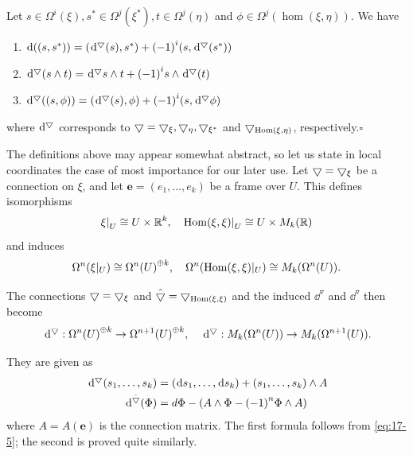 \begin{lemma}\label{lemma:17-12}
Let $s \in  \Omega^{i}(\xi),s^* \in  \Omega^{j}( \xi^*),t \in  \Omega^{j}( \eta )$ and $\phi  \in  \Omega^{j}( {\hom( \xi, \eta) })$. 
We have
\begin{enumerate}
  \item $\dd( ( {s,s^*}) )  = ( {\dd^\btd(s),s^*})  + {(-1) }^{i}( {s,\dd^\btd( s^*) })$
  \item $\dd^\btd( {s \land  t})  = \dd^\btd s \land  t + {(-1) }^{i}s \land  \dd^\btd(t)$
  \item $\dd^\btd( ( {s,\phi }) )  = ( {\dd^\btd(s),\phi })  + {(-1) }^{i}( {s,\dd^\btd\phi })$ 
\end{enumerate}

where $\dd^\btd$ corresponds to $\bigtriangledown  = \bigtriangledown_{\xi },\bigtriangledown_{\eta },\bigtriangledown_{\xi^*}$ 
and $\bigtriangledown_{\operatorname{Hom}( {\xi,\eta}) }$, respectively.\hfill$\square$
\end{lemma}

The definitions above may appear somewhat abstract, so let us state in local coordinates the case of most 
importance for our later use. Let $\bigtriangledown = \bigtriangledown_{\xi }$ be a connection on $\xi$, and 
let $\mathbf{e} = ( {{e}_1,\ldots,{e}_{k}})$ be a frame over $U$. This defines isomorphisms
\[
  {\xi|}_{U} \cong  U \times{\ensuremath{\mathbb{R}}}^{k},\quad 
  {\operatorname{Hom}(\xi, \xi)|}_U \cong  U \times  {M}_{k}( {\mathbb{R}})
\]
and induces
\[
  \Omega^{n}(\xi|_U)  \cong  \Omega^{n}{( U) }^{\oplus k},\quad
  \Omega^{n}(\operatorname{Hom}(\xi, \xi)|_U) \cong  {M}_{k}(\Omega^{n}(U)).
\]

The connections $\bigtriangledown = \bigtriangledown_{\xi }$ and $\hat{\bigtriangledown} = \bigtriangledown_{\operatorname{Hom}(\xi, \xi)}$ and the 
induced $\dd^\triangledown$ and $\dd^\triangledown$ then become
\[
  \dd^\btd:\Omega^{n}{(U) }^{\oplus k} \ra  \Omega^{n + 1}{(U) }^{\oplus k},\quad
  \dd^\btd:{M}_{k}(\Omega^{n}(U))  \ra  {M}_{k}(\Omega^{n + 1}(U)).
\]

They are given as
\begin{align}\label{eq:17-17}
  \begin{aligned}
    \dd^\btd( {{s}_1,\ldots,{s}_{k}})  & = ( {\!\dd{s}_1,\ldots,\!\dd{s}_{k}})  + ( {{s}_1,\ldots,{s}_{k}})  \land  A\\
    \dd^{\hat\btd}( \Phi ) & = {d\Phi }- ( {A \land  \Phi - {(-1) }^{n}\Phi  \land  A})
  \end{aligned}
\end{align}
where $A = A( \mathbf{e})$ is the connection matrix. The first formula follows from \eqref{eq:17-5}; the second is 
proved quite similarly.

